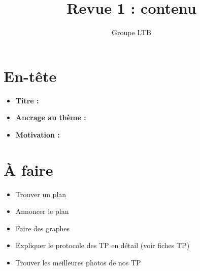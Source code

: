 \documentclass[french]{article}
\title{Revue 1 : contenu}
\author{Groupe LTB}
\begin{document}
\maketitle

\section{En-tête}

\begin{itemize}
    \item \textbf{Titre :}
    \item \textbf{Ancrage au thème :}
    \item \textbf{Motivation :}
\end{itemize}

\section{À faire}

\begin{itemize}
    \item Trouver un plan
    \item Annoncer le plan
    \item Faire des graphes
    \item Expliquer le protocole des TP en détail (voir fiches TP)
    \item Trouver les meilleures photos de nos TP
\end{itemize}
\end{document}
